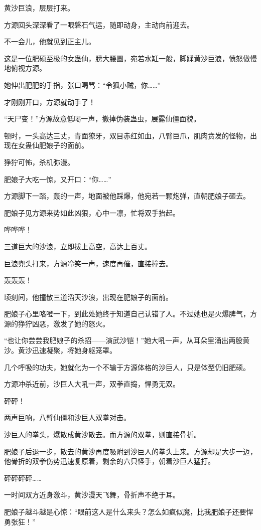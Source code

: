 \begin{this_body}
黄沙巨浪，层层打来。

方源回头深深看了一眼磐石气运，随即动身，主动向前迎去。

不一会儿，他就见到正主儿。

这是一位肥硕至极的女蛊仙，膀大腰圆，宛若水缸一般，脚踩黄沙巨浪，愤怒傲慢地俯视方源。

她伸出肥肥的手指，张口喝骂：“令狐小贼，你……”

才刚刚开口，方源就动手了！

“天尸变！”方源故意低喝一声，撤掉伪装蛊虫，展露仙僵面貌。

顿时，一头高达三丈，青面獠牙，双目赤红如血，八臂巨爪，肌肉贲发的怪物，出现在女蛊仙肥娘子的面前。

狰狞可怖，杀机弥漫。

肥娘子大吃一惊，又开口：“你……”

方源脚下一踏，轰的一声，地面被他踩爆，他宛若一颗炮弹，直朝肥娘子砸去。

肥娘子见方源来势如此凶狠，心中一凛，忙将双手抬起。

哗哗哗！

三道巨大的沙浪，立即拔上高空，高达上百丈。

巨浪兜头打来，方源冷笑一声，速度再催，直接撞去。

轰轰轰！

顷刻间，他撞散三道滔天沙浪，出现在肥娘子的面前。

肥娘子心里咯噔一下，到此处她终于知道自己认错了人。不过她也是火爆脾气，方源的狰狞凶恶，激发了她的怒火。

“也让你尝尝我肥娘子的杀招——演武沙铠！”她大吼一声，从耳朵里涌出两股黄沙。黄沙迅速凝聚，将她身躯笼罩。

几个呼吸的功夫，她就化为一个不输于方源体格的沙巨人，只是体型仍旧肥硕。

方源冲杀近前，沙巨人大吼一声，双拳直捣，悍勇无双。

砰砰！

两声巨响，八臂仙僵和沙巨人双拳对击。

沙巨人的拳头，爆散成黄沙散去。而方源的双拳，则直接骨折。

肥娘子后退一步，散去的黄沙再度吸附到沙巨人的拳头上来。方源却是大步一迈，他骨折的双拳伤势迅速复原着，剩余的六只怪手，朝着沙巨人猛打。

砰砰砰砰……

一时间双方近身激斗，黄沙漫天飞舞，骨折声不绝于耳。

肥娘子越斗越是心惊：“眼前这人是什么来头？怎么如疯似魔，比我肥娘子还要悍勇张狂！”

\end{this_body}

